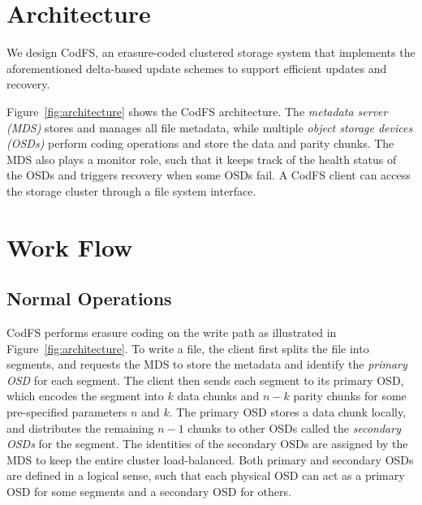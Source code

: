 \section{Architecture} 
\label{sec:design}

We design CodFS, an erasure-coded clustered storage system that implements 
the aforementioned delta-based update schemes to support efficient updates 
and recovery.  

Figure~\ref{fig:architecture} shows the CodFS architecture.  The
{\em metadata server (MDS)} stores and manages all file metadata, while
multiple {\em object storage devices (OSDs)} perform coding operations and
store the data and parity chunks.  The MDS also plays a monitor role, such
that it keeps track of the health status of the OSDs and triggers recovery
when some OSDs fail.  A CodFS client can access the storage cluster through a
file system interface. 

\section{Work Flow}
\label{sec:workflow}

\subsection{Normal Operations}

CodFS performs erasure coding on the write path as illustrated in
Figure~\ref{fig:architecture}.  To write a file, the client first splits the
file into segments, and requests the MDS to store the metadata and identify
the {\em primary OSD} for each segment.  The client then sends each segment to
its primary OSD, which encodes the segment into $k$ data chunks and $n-k$
parity chunks for some pre-specified parameters $n$ and $k$.  The primary OSD
stores a data chunk locally, and distributes the remaining $n-1$ chunks to
other OSDs called the {\em secondary OSDs} for the segment.  The identities of
the secondary OSDs are assigned by the MDS to keep the entire cluster
load-balanced.  Both primary and secondary OSDs are defined in a logical
sense, such that each physical OSD can act as a primary OSD for some segments
and a secondary OSD for others. 

